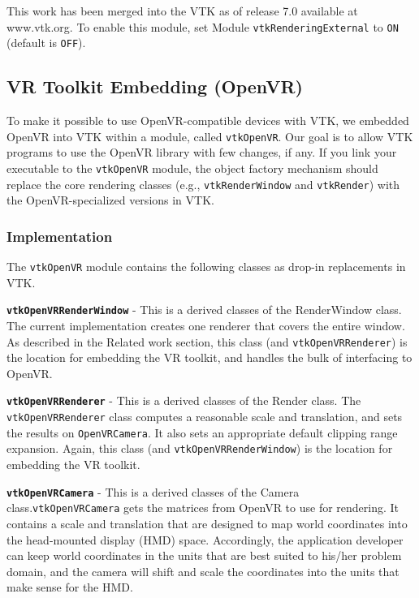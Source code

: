 This work has been merged into the VTK as of release 7.0 available at www.vtk.org.
To enable this module, set Module \texttt{vtkRenderingExternal} to \texttt{ON} (default is \texttt{OFF}).

\subsection{VR Toolkit Embedding (OpenVR)}

To make it possible to use OpenVR-compatible devices with VTK, we embedded OpenVR into VTK within a module, called \texttt{vtkOpenVR}.
Our goal is to allow VTK programs to use the OpenVR library with few changes, if any.
If you link your executable to the \texttt{vtkOpenVR} module, the object factory mechanism should replace the core rendering classes (e.g., \texttt{vtkRenderWindow} and \texttt{vtkRender}) with the OpenVR-specialized versions in VTK. 

\subsubsection{Implementation}

The \texttt{vtkOpenVR} module contains the following classes as drop-in replacements in VTK.

\textbf{\texttt{vtkOpenVRRenderWindow}} - This is a derived classes of the RenderWindow class.
The current implementation creates one renderer that covers the entire window.
As described in the Related work section, this class (and \texttt{vtkOpenVRRenderer}) is the location for embedding the VR toolkit, and handles the bulk of interfacing to OpenVR. 

\textbf{\texttt{vtkOpenVRRenderer}} - This is a derived classes of the Render class.
The \texttt{vtkOpenVRRenderer} class computes a reasonable scale and translation, and sets the results on \texttt{OpenVRCamera}.
It also sets an appropriate default clipping range expansion.
Again, this class (and \texttt{vtkOpenVRRenderWindow}) is the location for embedding the VR toolkit.

\textbf{\texttt{vtkOpenVRCamera}} - This is a derived classes of the Camera class.\texttt{vtkOpenVRCamera} gets the matrices from OpenVR to use for rendering.
It contains a scale and translation that are designed to map world coordinates into the head-mounted display (HMD) space.
Accordingly, the application developer can keep world coordinates in the units that are best suited to his/her problem domain, and the camera will shift and scale the coordinates into the units that make sense for the HMD.

